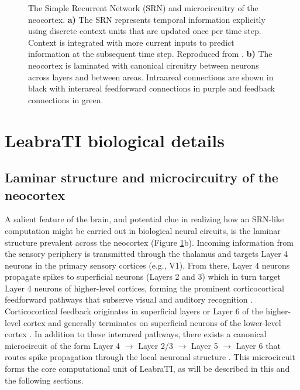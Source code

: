 \documentclass[dwyatte_dissertation.tex]{subfiles}
\begin{document}
\begin{figure}[hp]
\begin{tabular}{ll}
\end{tabular}
\caption{The Simple Recurrent Network (SRN) and microcircuitry of the neocortex. \textbf{a)} The SRN represents temporal information explicitly using discrete context units that are updated once per time step. Context is integrated with more current inputs to predict information at the subsequent time step. Reproduced from \protect{}. \textbf{b)} The neocortex is laminated with canonical circuitry between neurons across layers and between areas. Intraareal connections are shown in black with interareal feedforward connections in purple and feedback connections in green.}
\label{fig:srn_circuit}
\end{figure}

\section{LeabraTI biological details}
\subsection{Laminar structure and microcircuitry of the neocortex}

A salient feature of the brain, and potential clue in realizing how an SRN-like computation might be carried out in biological neural circuits, is the laminar structure prevalent across the neocortex (Figure \ref{fig:srn_circuit}b). Incoming information from the sensory periphery is transmitted through the thalamus and targets Layer 4 neurons in the primary sensory cortices (e.g., V1). From there, Layer 4 neurons propagate spikes to superficial neurons (Layers 2 and 3) which in turn target Layer 4 neurons of higher-level cortices, forming the prominent corticocortical feedforward pathways that subserve visual and auditory recognition \cite{FellemanVanEssen91}. Corticocortical feedback originates in superficial layers or Layer 6 of the higher-level cortex and generally terminates on superficial neurons of the lower-level cortex \cite{RocklandPandya79}. In addition to these interareal pathways, there exists a canonical microcircuit of the form Layer 4 $\rightarrow$ Layer 2/3 $\rightarrow$ Layer 5 $\rightarrow$ Layer 6 that routes spike propagation through the local neuronal structure \cite{DouglasMartin04,ThomsonLamy07}. This microcircuit forms the core computational unit of LeabraTI, as will be described in this and the following sections.
\end{document}
